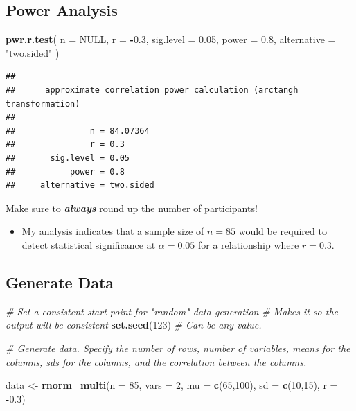 \documentclass[
]{book}
\newenvironment{Shaded}{\begin{snugshade}}{\end{snugshade}}
\newcommand{\AttributeTok}[1]{\textcolor[rgb]{0.13,0.29,0.53}{#1}}
\newcommand{\CommentTok}[1]{\textcolor[rgb]{0.56,0.35,0.01}{\textit{#1}}}
\newcommand{\ConstantTok}[1]{\textcolor[rgb]{0.56,0.35,0.01}{#1}}
\newcommand{\DecValTok}[1]{\textcolor[rgb]{0.00,0.00,0.81}{#1}}
\newcommand{\FloatTok}[1]{\textcolor[rgb]{0.00,0.00,0.81}{#1}}
\newcommand{\FunctionTok}[1]{\textcolor[rgb]{0.13,0.29,0.53}{\textbf{#1}}}
\newcommand{\NormalTok}[1]{#1}
\newcommand{\OtherTok}[1]{\textcolor[rgb]{0.56,0.35,0.01}{#1}}
\newcommand{\SpecialCharTok}[1]{\textcolor[rgb]{0.81,0.36,0.00}{\textbf{#1}}}
\newcommand{\StringTok}[1]{\textcolor[rgb]{0.31,0.60,0.02}{#1}}
\providecommand{\tightlist}{%
  \setlength{\itemsep}{0pt}\setlength{\parskip}{0pt}}
\begin{document}
\subsection{Power Analysis}\label{power-analysis}

\begin{Shaded}
\begin{Highlighting}[]
\FunctionTok{pwr.r.test}\NormalTok{(}
  \AttributeTok{n =} \ConstantTok{NULL}\NormalTok{,}
  \AttributeTok{r =} \SpecialCharTok{{-}}\FloatTok{0.3}\NormalTok{,}
  \AttributeTok{sig.level =} \FloatTok{0.05}\NormalTok{,}
  \AttributeTok{power =} \FloatTok{0.8}\NormalTok{,}
  \AttributeTok{alternative =} \StringTok{"two.sided"}
\NormalTok{)}
\end{Highlighting}
\end{Shaded}

\begin{verbatim}
## 
##      approximate correlation power calculation (arctangh transformation) 
## 
##               n = 84.07364
##               r = 0.3
##       sig.level = 0.05
##           power = 0.8
##     alternative = two.sided
\end{verbatim}

Make sure to \textbf{\emph{always}} round up the number of participants!

\begin{itemize}
\tightlist
\item
  My analysis indicates that a sample size of \(n = 85\) would be required to detect statistical significance at \(\alpha = 0.05\) for a relationship where \(r = 0.3\).
\end{itemize}

\subsection*{Generate Data}\label{generate-data}

\begin{Shaded}
\begin{Highlighting}[]
\CommentTok{\# Set a consistent start point for "random" data generation}
\CommentTok{\# Makes it so the output will be consistent}
\FunctionTok{set.seed}\NormalTok{(}\DecValTok{123}\NormalTok{) }\CommentTok{\# Can be any value. }

\CommentTok{\# Generate data. Specify the number of rows, number of variables, means for the columns, sd\textquotesingle{}s for the columns, and the correlation between the columns.}

\NormalTok{data }\OtherTok{\textless{}{-}} \FunctionTok{rnorm\_multi}\NormalTok{(}\AttributeTok{n =} \DecValTok{85}\NormalTok{, }\AttributeTok{vars =} \DecValTok{2}\NormalTok{, }\AttributeTok{mu =} \FunctionTok{c}\NormalTok{(}\DecValTok{65}\NormalTok{,}\DecValTok{100}\NormalTok{), }\AttributeTok{sd =} \FunctionTok{c}\NormalTok{(}\DecValTok{10}\NormalTok{,}\DecValTok{15}\NormalTok{), }\AttributeTok{r =} \SpecialCharTok{{-}}\FloatTok{0.3}\NormalTok{)}
\end{Highlighting}
\end{Shaded}
\end{document}
